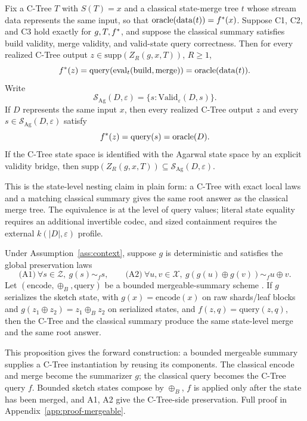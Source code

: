 \begin{proposition}
\label{prop:exact-query-equivalence}
Fix a C-Tree \(T\) with \(S(T)=x\) and a classical state-merge tree
\(t\) whose stream data represents the same input, so that
\(\mathrm{oracle}(\mathrm{data}(t))=f^\ast(x)\). Suppose C1, C2, and
C3 hold exactly for \(g,T,f^\ast\), and suppose the classical summary
satisfies build validity, merge validity, and valid-state query
correctness. Then for every realized C-Tree output
\(z\in\mathrm{supp}(Z_R(g,x,T))\), \(R\ge 1\),
\[
  f^\ast(z)
  =
  \mathrm{query}\!\left(\mathrm{eval}_t(\mathrm{build},\mathrm{merge})\right)
  =
  \mathrm{oracle}(\mathrm{data}(t)).
\]
Write
\[
  \mathcal{S}_{\mathrm{Ag}}(D,\varepsilon)
  =
  \{s:\mathrm{Valid}_{\varepsilon}(D,s)\}.
\]
If \(D\) represents the same input \(x\), then every realized C-Tree
output \(z\) and every
\(s\in\mathcal{S}_{\mathrm{Ag}}(D,\varepsilon)\) satisfy
\[
  f^\ast(z)=\mathrm{query}(s)=\mathrm{oracle}(D).
\]
If the C-Tree state space is identified with the Agarwal state space by
an explicit validity bridge, then
\(\mathrm{supp}(Z_R(g,x,T))\subseteq
\mathcal{S}_{\mathrm{Ag}}(D,\varepsilon)\).
\end{proposition}

This is the state-level nesting claim in plain form: a C-Tree with
exact local laws and a matching classical summary gives the same root
answer as the classical merge tree. The equivalence is at the
level of query values; literal state equality requires an additional
invertible codec, and sized containment requires the external
\(k(|D|,\varepsilon)\) profile.

\begin{proposition}
\label{prop:mergeable-reduction}
Under Assumption~\ref{ass:context}, suppose \(g\) is deterministic
and satisfies the global preservation laws
\[
\text{(A1)}\ \forall s\in\mathcal{Z},\ g(s)\sim_f s,\qquad
\text{(A2)}\ \forall u,v\in\mathcal{X},\
  g(g(u)\oplus g(v))\sim_f u\oplus v.
\]
Let \((\mathrm{encode},\oplus_B,\mathrm{query})\) be a bounded
mergeable-summary scheme \citep{Agarwal2013MergeableTODS}. If \(g\)
serializes the sketch state, with \(g(x)=\mathrm{encode}(x)\) on
raw shards/leaf blocks and \(g(z_1\oplus z_2)=z_1\oplus_B z_2\) on
serialized states, and \(f(z,q)=\mathrm{query}(z,q)\), then the C-Tree
and the classical summary produce the same state-level merge and the
same root answer.
\end{proposition}

This proposition gives the forward construction: a bounded mergeable
summary supplies a C-Tree instantiation by reusing its components.
The classical encode and merge become the summarizer \(g\); the
classical query becomes the C-Tree query \(f\). Bounded sketch states
compose by \(\oplus_B\), \(f\) is applied only after the state has
been merged, and A1, A2 give the C-Tree-side preservation. Full proof
in Appendix~\ref{app:proof-mergeable}.

